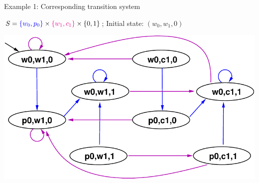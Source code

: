 \begin{frame}{Example 1: Corresponding transition system}

$S = \tc{blue}{\{w_0,p_0\}}\times\tc{magenta}{\{w_1,c_1\}}\times\{0,1\}$;
  \quad Initial state: $(w_0,w_1,0)$

\bigskip
\begin{center}
  \includegraphics[width=\textwidth]{content/chapter_model_checking/model_checking/images/mutex-ts}
\end{center}

\end{frame}


